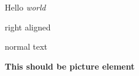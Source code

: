 \documentclass{article}
\newenvironment{rightaligned}{}{}
\newenvironment{topicture}{\bfseries}{}
\begin{document}
Hello \textit{world}

\begin{rightaligned}
right aligned
\end{rightaligned}

normal text

\begin{topicture}
This should be picture element
\end{topicture}
\end{document}
